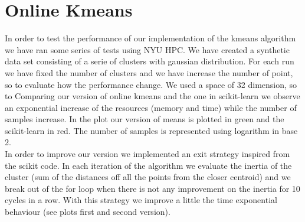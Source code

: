 \documentclass[12pt]{article}
\begin{document}
\section{Online Kmeans}
In order to test the performance of our implementation of the kmeans algorithm we have ran some series of tests using NYU HPC. We have created a synthetic data set consisting of a serie of clusters with gaussian distribution. For each run we have fixed the number of clusters and we have increase the number of point, so to evaluate how the performance change.  We used a space of 32 dimension, so to  
Comparing our version of online kmeans and the one in scikit-learn we observe an exponential increase of the resources (memory and time) while the number of samples increase. In the plot our version of means is plotted in green and the scikit-learn in red. The number of samples is represented using logarithm in base 2.\\
In order to improve our version we implemented an exit strategy inspired from the scikit code. In each iteration of the algorithm we evaluate the inertia of the cluster (sum of the distances off all the points from the closer centroid) and we break out of the for loop when there is not any improvement on the inertia for 10 cycles in a row. With this strategy we improve a little the time exponential behaviour (see plots first and second version).
\end{document}
